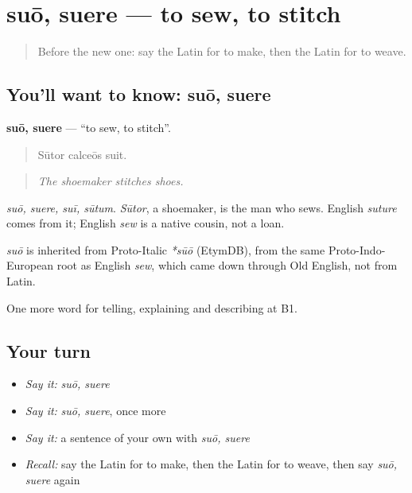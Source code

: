 \section[suō, suere]{suō, suere — to sew, to stitch}

\label{lesson:LA-C378-suo}



\begin{quote}
Before the new one: say the Latin for to make, then the Latin for to weave.
\end{quote}

\subsection*{You'll want to know: suō, suere}
\textbf{suō, suere} — \textquotedblleft{}to sew, to stitch\textquotedblright{}.

\begin{quote}
Sūtor calceōs suit.
\end{quote}

\begin{quote}
\emph{The shoemaker stitches shoes.}
\end{quote}

\emph{suō, suere, suī, sūtum}. \emph{Sūtor}, a shoemaker, is the man who sews. English \emph{suture} comes from it; English \emph{sew} is a native cousin, not a loan.

\begin{cousinweb}
\emph{suō} is inherited from Proto-Italic \emph{*sūō} (EtymDB), from the same Proto-Indo-European root as English \emph{sew}, which came down through Old English, not from Latin.
\end{cousinweb}

\begin{grammarlens}[title={What you've built}]
One more word for telling, explaining and describing at B1.
\end{grammarlens}

\subsection*{Your turn}
\begin{itemize}
\raggedright
  \item \emph{Say it:} \emph{suō, suere}
  \item \emph{Say it:} \emph{suō, suere}, once more
  \item \emph{Say it:} a sentence of your own with \emph{suō, suere}
  \item \emph{Recall:} say the Latin for to make, then the Latin for to weave, then say \emph{suō, suere} again
\end{itemize}


